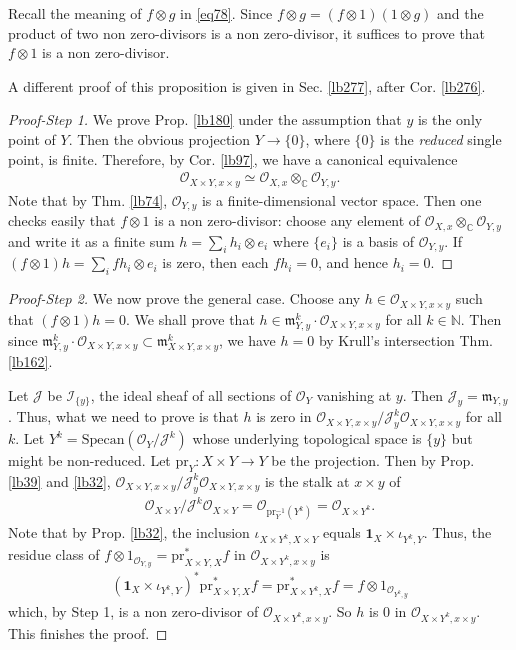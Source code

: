 \documentclass[12pt,b5paper,notitlepage]{report}
\theoremstyle{definition}
\theoremstyle{plain}
\newcommand{\fk}{\mathfrak}
\newcommand{\mc}{\mathcal}
\newcommand{\id}{\mathbf{1}}
\newcommand{\scr}{\mathscr}
\newcommand{\Cbb}{\mathbb C}
\newcommand{\Nbb}{\mathbb N}
\newcommand{\pr}{\mathrm {pr}}
\newcommand{\Specan}{\mathrm{Specan}}
\numberwithin{equation}{section}
\begin{document}
Recall the meaning of $f\otimes g$ in \eqref{eq78}. Since $f\otimes g=(f\otimes 1)(1\otimes g)$ and the product of two non zero-divisors is a non zero-divisor, it suffices to prove that $f\otimes 1$ is a non zero-divisor.

A different proof of this proposition is given in Sec. \ref{lb277}, after Cor. \ref{lb276}.

 
\begin{proof}[Proof-Step 1]
We prove Prop. \ref{lb180} under the assumption that $y$ is the only point of $Y$. Then the obvious projection $Y\rightarrow\{0\}$, where $\{0\}$ is the \emph{reduced} single point, is finite.  Therefore, by Cor. \ref{lb97}, we have a canonical equivalence
\begin{align*}
\scr O_{X\times Y,x\times y}\simeq \scr O_{X,x}\otimes_\Cbb\scr O_{Y,y}.
\end{align*}
Note that by Thm. \ref{lb74}, $\scr O_{Y,y}$ is a finite-dimensional vector space. Then one checks easily that $f\otimes 1$ is a non zero-divisor: choose any element of  $\scr O_{X,x}\otimes_\Cbb\scr O_{Y,y}$ and write it as a finite sum $h=\sum_i h_i\otimes e_i$ where $\{e_i\}$ is a basis of $\scr O_{Y,y}$. If $(f\otimes 1)h=\sum_i fh_i\otimes e_i$ is zero, then each $fh_i=0$, and hence $h_i=0$.
\end{proof}


\begin{proof}[Proof-Step 2]
We now prove the general case. Choose any $h\in\scr O_{X\times Y,x\times y}$ such that $(f\otimes 1)h=0$. We shall prove that $h\in \fk m_{Y,y}^k\cdot\scr O_{X\times Y,x\times y}$ for all $k\in\Nbb$. Then since $\fk m_{Y,y}^k\cdot\scr O_{X\times Y,x\times y}\subset\fk m_{X\times Y,x\times y}^k$, we have $h=0$ by Krull's intersection Thm. \ref{lb162}.


Let $\mc J$ be $\scr I_{\{y\}}$, the ideal sheaf of all sections of $\scr O_{Y}$ vanishing at $y$. Then $\mc J_y=\fk m_{Y,y}$. Thus, what we need to prove is that $h$ is zero in $\scr O_{X\times Y,x\times y}/\mc J_y^k\scr O_{X\times Y,x\times y}$ for all $k$. Let $Y^k=\Specan(\scr O_Y/\mc J^k)$ whose underlying topological space is $\{y\}$ but might be non-reduced. Let $\pr_Y:X\times Y\rightarrow Y$ be the projection. Then by Prop. \ref{lb39} and \ref{lb32}, $\scr O_{X\times Y,x\times y}/\mc J_y^k\scr O_{X\times Y,x\times y}$ is the stalk at $x\times y$ of
\begin{align*}
\scr O_{X\times Y}/\mc J^k\scr O_{X\times Y}=\scr O_{\pr_Y^{-1}(Y^k)}=\scr O_{X\times Y^k}.
\end{align*}
Note that by Prop. \ref{lb32}, the inclusion $\iota_{X\times Y^k,X\times Y}$ equals $\id_X\times\iota_{Y^k,Y}$. Thus, the residue class of $f\otimes 1_{\scr O_{Y,y}}=\pr_{X\times Y,X}^*f$ in $\scr O_{X\times Y^k,x\times y}$ is
\begin{align*}
(\id_X\times\iota_{Y^k,Y})^*\pr_{X\times Y,X}^*f=\pr_{X\times Y^k,X}^*f=f\otimes 1_{\scr O_{Y^k,y}}
\end{align*}
which,  by Step 1, is a non zero-divisor of $\scr O_{X\times Y^k,x\times y}$. So $h$ is $0$ in $\scr O_{X\times Y^k,x\times y}$. This finishes the proof.
\end{proof}
\end{document}
